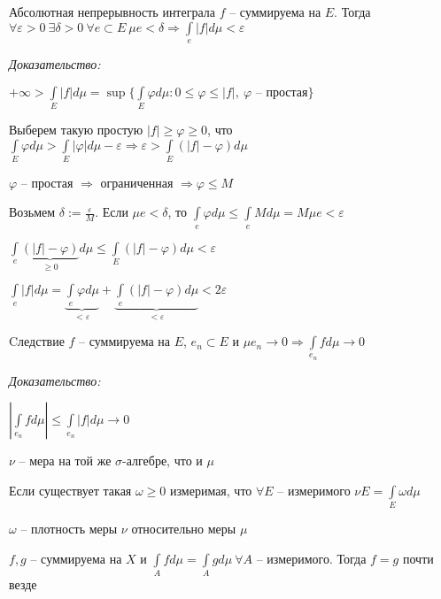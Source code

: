 \documentclass[12pt]{article}
\begin{document}
\begin{theo}{Абсолютная непрерывность интеграла}
    $f$ -- суммируема на $E$. Тогда $\forall \varepsilon > 0\ \exists \delta > 0\ \forall e \subset E\ \mu e < \delta \Rightarrow \int\limits_e |f|d\mu < \varepsilon$
\end{theo}

\textit{Доказательство:}

$+ \infty > \int\limits_E |f|d\mu = \sup\{\int\limits_E \varphi d\mu : 0 \leq \varphi \leq |f|,\ \varphi \text{ -- простая}\}$

Выберем такую простую $|f| \geq \varphi \geq 0$, что $\int\limits_E \varphi d\mu > \int\limits_E |\varphi|d\mu - \varepsilon \Rightarrow \varepsilon > \int\limits_E (|f| - \varphi)d\mu$

$\varphi$ -- простая $\Rightarrow$ ограниченная $\Rightarrow \varphi \leq M$

Возьмем $\delta := \frac{\varepsilon}{M}$. Если $\mu e < \delta$, то $\int\limits_e \varphi d\mu \leq \int\limits_e Md\mu = M\mu e < \varepsilon$

$\int\limits_e \underbrace{(|f| - \varphi)}_{\geq 0} d\mu \leq \int\limits_E (|f| - \varphi)d\mu < \varepsilon$

$\int\limits_e |f|d\mu = \underbrace{\int\limits_e \varphi d\mu}_{< \varepsilon} + \underbrace{\int\limits_e (|f| - \varphi)d\mu}_{< \varepsilon} < 2\varepsilon$

\begin{theo}{Cледствие}
    $f$ -- суммируема на $E$, $e_n \subset E$ и $\mu e_n \to 0 \Rightarrow \int\limits_{e_n} fd\mu \to 0$
\end{theo}

\textit{Доказательство:}

$|\int\limits_{e_n} fd\mu| \leq \int\limits_{e_n} |f|d\mu \to 0$

\begin{defin}{}
    $\nu$ -- мера на той же $\sigma$-алгебре, что и $\mu$ 

    Если существует такая $\omega \geq 0$ измеримая, что $\forall E$ -- измеримого $\nu E = \int\limits_E \omega d\mu$

    $\omega$ -- плотность меры $\nu$ относительно меры $\mu$
\end{defin}

\begin{theo}{}
    $f, g$ -- суммируема на $X$ и $\int\limits_A fd\mu = \int\limits_A gd\mu\ \forall A$ -- измеримого. Тогда $f = g$ почти везде
\end{theo}
\end{document}
